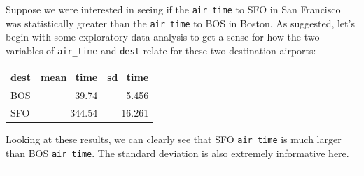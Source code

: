 \documentclass[]{tufte-book}
\newenvironment{Shaded}{\begin{snugshade}}{\end{snugshade}}
\newcommand{\KeywordTok}[1]{\textcolor[rgb]{0.13,0.29,0.53}{\textbf{{#1}}}}
\newcommand{\DataTypeTok}[1]{\textcolor[rgb]{0.13,0.29,0.53}{{#1}}}
\newcommand{\DecValTok}[1]{\textcolor[rgb]{0.00,0.00,0.81}{{#1}}}
\newcommand{\StringTok}[1]{\textcolor[rgb]{0.31,0.60,0.02}{{#1}}}
\newcommand{\NormalTok}[1]{{#1}}
\let\oldrule=\rule
\renewcommand{\rule}[1]{\oldrule{\linewidth}}
\begin{document}
\begin{Shaded}
\end{Shaded}

Suppose we were interested in seeing if the \texttt{air\_time} to SFO in
San Francisco was statistically greater than the \texttt{air\_time} to
BOS in Boston. As suggested, let's begin with some exploratory data
analysis to get a sense for how the two variables of \texttt{air\_time}
and \texttt{dest} relate for these two destination airports:

\begin{Shaded}
\end{Shaded}

\begin{tabular}{l|r|r}
\hline
dest & mean\_time & sd\_time\\
\hline
BOS & 39.74 & 5.456\\
\hline
SFO & 344.54 & 16.261\\
\hline
\end{tabular}

Looking at these results, we can clearly see that SFO \texttt{air\_time}
is much larger than BOS \texttt{air\_time}. The standard deviation is
also extremely informative here.

\begin{center}\rule{0.5\linewidth}{\linethickness}\end{center}
\end{document}
